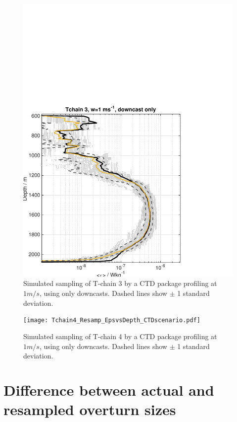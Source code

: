 \documentclass[11pt]{article}
\begin{document}
\begin{figure}[htbp]
\includegraphics[scale=0.8]{Tchain3_Resamp_EpsvsDepth_CTDscenario.pdf}
\caption{Simulated sampling of T-chain 3 by a CTD package profiling at $1m/s$, using only downcasts. Dashed lines show $\pm$ 1 standard deviation.}
\label{}
\end{figure}

\begin{figure}[htbp]
\texttt{[image: Tchain4\_Resamp\_EpsvsDepth\_CTDscenario.pdf]}
\caption{Simulated sampling of T-chain 4 by a CTD package profiling at $1m/s$, using only downcasts. Dashed lines show $\pm$ 1 standard deviation.}
\label{}
\end{figure}


\newpage
\clearpage
\section{Difference between actual and resampled overturn sizes}
\end{document}

